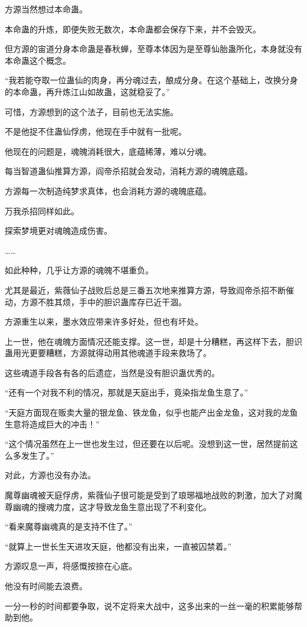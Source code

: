 \begin{this_body}
方源当然想过本命蛊。

本命蛊的升炼，即便失败无数次，本命蛊都会保存下来，并不会毁灭。

但方源的宙道分身本命蛊是春秋蝉，至尊本体因为是至尊仙胎蛊所化，本身就没有本命蛊这个概念。

“我若能夺取一位蛊仙的肉身，再分魂过去，酿成分身。在这个基础上，改换分身的本命蛊，再升炼江山如故蛊，这就稳妥了。”

可惜，方源想到的这个法子，目前也无法实施。

不是他捉不住蛊仙俘虏，他现在手中就有一批呢。

他现在的问题是，魂魄消耗很大，底蕴稀薄，难以分魂。

每当智道蛊仙推算方源，阎帝杀招就会发动，消耗方源的魂魄底蕴。

方源每一次制造纯梦求真体，也会消耗方源的魂魄底蕴。

万我杀招同样如此。

探索梦境更对魂魄造成伤害。

……

如此种种，几乎让方源的魂魄不堪重负。

尤其是最近，紫薇仙子战败后总是三番五次地来推算方源，导致阎帝杀招不断催动，方源不胜其烦，手中的胆识蛊库存已近干涸。

方源重生以来，墨水效应带来许多好处，但也有坏处。

上一世，他在魂魄方面情况还能支撑。这一世，却是十分糟糕，再这样下去，胆识蛊用光更要糟糕，方源就得动用其他魂道手段来救场了。

这些魂道手段各有各的后遗症，当然是没有胆识蛊优秀的。

“还有一个对我不利的情况，那就是天庭出手，竟染指龙鱼生意了。”

“天庭方面现在贩卖大量的银龙鱼、铁龙鱼，似乎也能产出金龙鱼，这对我的龙鱼生意将造成巨大的冲击！”

“这个情况虽然在上一世也发生过，但还要在以后呢。没想到这一世，居然提前这么多发生了。”

对此，方源也没有办法。

魔尊幽魂被天庭俘虏，紫薇仙子很可能是受到了琅琊福地战败的刺激，加大了对魔尊幽魂的搜魂力度，这才导致龙鱼生意出现了不利变化。

“看来魔尊幽魂真的是支持不住了。”

“就算上一世长生天进攻天庭，他都没有出来，一直被囚禁着。”

方源叹息一声，将感慨按捺在心底。

他没有时间能去浪费。

一分一秒的时间都要争取，说不定将来大战中，这多出来的一丝一毫的积累能够帮助到他。


\end{this_body}
